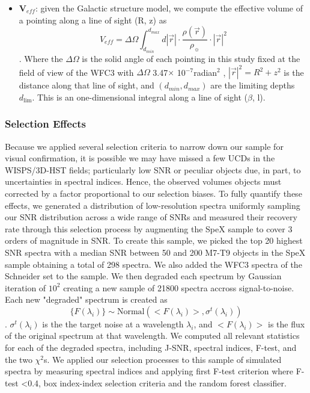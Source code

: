 \documentclass[manuscript]{aastex63}
\begin{document}
\begin{itemize}
\item \textbf{ V$_{eff}$}: given the Galactic structure model, we compute the effective volume of a pointing along a line of sight (R, z) as \begin{equation}V_{eff}=\Delta \Omega \int _{d_{min}} ^{d_{max}} d|\vec{r}|  \cdot \frac{\rho(\vec{r})} {\rho _\sun}\cdot |\vec{r}|^2 \end{equation}. Where the $\Delta \Omega$ is the solid angle of each pointing in this study fixed at the field of view of the WFC3 with $\Delta \Omega$ 3.47$\times$ 10$^{-7}$radian$^2$ , $|\vec{r}|^2 = R^2 +z ^2$ is the distance along that line of sight, and $(d_{min}, d_{max})$ are the limiting depths $d_\text{lim}$. This is an one-dimensional integral along a line of sight ($\beta$, l).

\end{itemize}

\subsubsection{Selection Effects}
Because we applied several selection criteria to narrow down our sample for visual confirmation, it is possible we may have missed a few UCDs in the WISPS/3D-HST fields; particularly low SNR or peculiar objects due, in part, to uncertainties in spectral indices. Hence, the observed volumes objects must corrected by a factor proportional to our selection biases. To fully quantify these effects, we generated a distribution of low-resolution spectra uniformly sampling our SNR distribution across a wide range of SNRs and measured their recovery rate through this selection process by augmenting the SpeX sample to cover 3 orders of magnitude in SNR. To create this sample, we picked the top 20 highest SNR spectra with a median SNR between 50 and 200 M7-T9 objects in the SpeX sample obtaining a total of 298 spectra. We also added the WFC3 spectra of the Schneider set to the sample. We then degraded each spectrum by Gaussian iteration of $10^2$ creating a new sample of 21800 spectra accross signal-to-noise. Each new "degraded" spectrum is created as \begin{equation} \{F(\lambda _i)\} \sim \text{Normal} (<F(\lambda_i)>, \sigma^t(\lambda_i )) \end{equation}. $\sigma^t(\lambda_i )$ is the the target noise at a wavelength $\lambda_i$, and $<F(\lambda_i )>$ is the flux of the original spectrum at that wavelength. We computed all relevant statistics for each of the degraded spectra, including J-SNR, spectral indices, F-test, and the two $\chi^2$s. We applied our selection processes to this sample of simulated spectra by measuring spectral indices and applying first F-test criterion where F-test \textless 0.4, box index-index selection criteria and the random forest classifier. 
\end{document}
